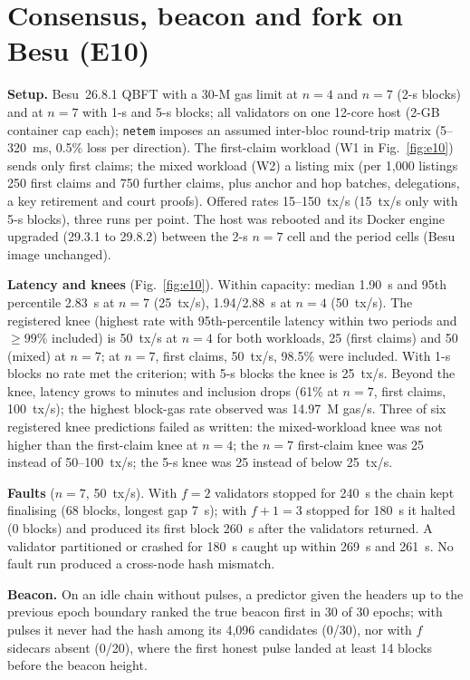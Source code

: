 \documentclass[10pt]{article}
\begin{document}
\section{Consensus, beacon and fork on Besu (E10)}
\label{sec:e10}
\textbf{Setup.} Besu~26.8.1 QBFT with a 30-M gas limit at $n=4$ and $n=7$ (2-s blocks) and at $n=7$ with 1-s and 5-s
blocks; all validators on one 12-core host (2-GB container cap each); \texttt{netem} imposes an assumed inter-bloc
round-trip matrix (5--320~ms, 0.5\% loss per direction). The first-claim workload (W1 in Fig.~\ref{fig:e10}) sends only first claims; the mixed workload (W2) a listing mix
(per 1,000 listings 250 first claims and 750 further claims, plus anchor and hop batches, delegations, a key retirement
and court proofs). Offered rates 15--150~tx/s (15~tx/s only with 5-s blocks), three runs per point. The host was rebooted and its Docker engine upgraded
(29.3.1 to 29.8.2) between the 2-s $n=7$ cell and the period cells (Besu image unchanged).

\textbf{Latency and knees} (Fig.~\ref{fig:e10}). Within capacity: median 1.90~s and 95th percentile 2.83~s at $n=7$ (25~tx/s),
1.94/2.88~s at $n=4$ (50~tx/s). The registered knee (highest rate with 95th-percentile latency within two periods and
$\ge99\%$ included) is 50~tx/s at $n=4$ for both workloads, 25 (first claims) and 50 (mixed) at $n=7$; at $n=7$, first claims,
50~tx/s, 98.5\% were included. With 1-s blocks no rate met the criterion; with 5-s blocks the knee is 25~tx/s. Beyond the knee, latency
grows to minutes and inclusion drops (61\% at $n=7$, first claims, 100~tx/s); the highest block-gas rate observed was
14.97~M gas/s. Three of six registered knee predictions failed as written: the mixed-workload knee was not higher than the
first-claim knee at $n=4$; the $n=7$ first-claim knee was 25 instead of 50--100~tx/s; the 5-s knee was 25 instead of below 25~tx/s.

\textbf{Faults} ($n=7$, 50~tx/s). With $f=2$ validators stopped for 240~s the chain kept finalising (68 blocks, longest
gap 7~s); with $f+1=3$ stopped for 180~s it halted (0 blocks) and produced its first block 260~s after the validators
returned. A validator partitioned or crashed for 180~s caught up within 269~s and 261~s. No fault run produced a
cross-node hash mismatch.

\textbf{Beacon.} On an idle chain without pulses, a predictor given the headers up to the previous epoch boundary ranked
the true beacon first in 30 of 30 epochs; with pulses it never had the hash among its 4,096 candidates (0/30), nor with
$f$ sidecars absent (0/20), where the first honest pulse landed at least 14 blocks before the beacon height.
\end{document}
